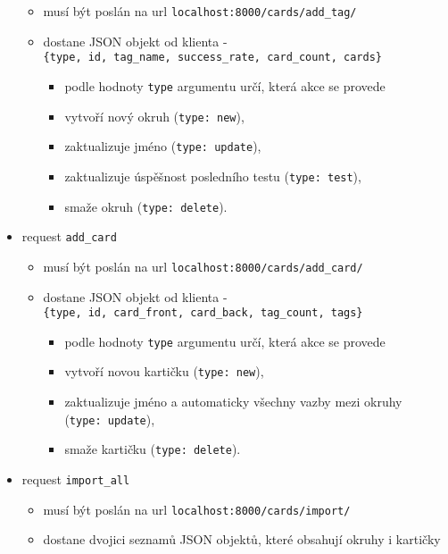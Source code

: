 \documentclass[11pt]{article}
\providecommand{\tightlist}{\setlength{\itemsep}{1pt}\setlength{\parskip}{1pt}}
\let\oldtexttt\texttt
\renewcommand{\texttt}[1]{\oldtexttt{\textcolor{codehighlight}{#1}}}
\begin{document}
\begin{itemize}
  \begin{itemize}
  \tightlist
  \item
    musí být poslán na url \texttt{localhost:8000/cards/add\_tag/}
  \item
    dostane JSON objekt od klienta -
    \texttt{\{type,\ id,\ tag\_name,\ success\_rate,\ card\_count,\ cards\}}

    \begin{itemize}
    \tightlist
    \item
      podle hodnoty \texttt{type} argumentu určí, která akce se provede
    \item
      vytvoří nový okruh (\texttt{type:\ new}),
    \item
      zaktualizuje jméno (\texttt{type:\ update}),
    \item
      zaktualizuje úspěšnost posledního testu (\texttt{type:\ test}),
    \item
      smaže okruh (\texttt{type:\ delete}).
    \end{itemize}
  \end{itemize}
\item
  request \texttt{add\_card}

  \begin{itemize}
  \tightlist
  \item
    musí být poslán na url \texttt{localhost:8000/cards/add\_card/}
  \item
    dostane JSON objekt od klienta -
    \texttt{\{type,\ id,\ card\_front,\ card\_back,\ tag\_count,\ tags\}}

    \begin{itemize}
    \tightlist
    \item
      podle hodnoty \texttt{type} argumentu určí, která akce se provede
    \item
      vytvoří novou kartičku (\texttt{type:\ new}),
    \item
      zaktualizuje jméno a automaticky všechny vazby mezi okruhy
      (\texttt{type:\ update}),
    \item
      smaže kartičku (\texttt{type:\ delete}).
    \end{itemize}
  \end{itemize}
\item
  request \texttt{import\_all}

  \begin{itemize}
  \item
    musí být poslán na url \texttt{localhost:8000/cards/import/}
  \item
    dostane dvojici seznamů JSON objektů, které obsahují okruhy i
    kartičky


\end{itemize}
\end{itemize}
\end{document}
